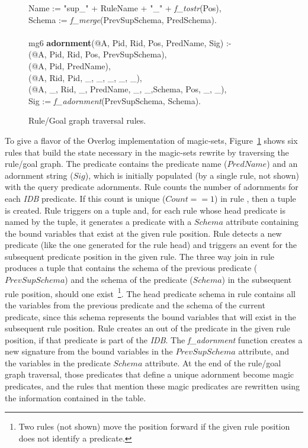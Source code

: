 \begin{figure}[t]
\begin{boxedminipage}{\linewidth}
\datalogspace Name := "sup\_" + RuleName + "\_" + {\em f\_tostr}(Pos),\\
\datalogspace Schema := {\em f\_merge}(PrevSupSchema, PredSchema).\\
\\
mg6 {\small \bf adornment}(@A, Pid, Rid, Pos, PredName, Sig) :- \\
(@A, Pid, Rid, Pos, PrevSupSchema),\\
(@A, Pid, PredName), \\
(@A, Rid, Pid, \_, \_, \_, \_, \_),\\
(@A, \_, Rid, \_, PredName, \_, \_,Schema, Pos, \_, \_),\\ 
\datalogspace Sig := {\em f\_adornment}(PrevSupSchema, Schema).
\end{boxedminipage}
\caption{\label{fig:magicRules}Rule/Goal graph traversal rules.}
\end{figure}

To give a flavor of the Overlog implementation of magic-sets,
Figure~\ref{fig:magicRules} shows six rules that build the state
necessary in the magic-sets rewrite by traversing the rule/goal graph. 
The  predicate contains the predicate name ($PredName$) and an
adornment string ($Sig$), which is initially populated (by a single rule, not shown) with
the query predicate adornments. Rule  counts the number of
adornments for each {\em IDB} predicate. If this count is unique ($Count == 1$) in rule ,
then a  tuple is created. Rule  triggers on a  tuple and, for each
rule whose head predicate is named by the  tuple, it generates a  predicate
with a $Schema$ attribute containing the bound variables that exist at the given rule position. 
Rule  detects a new  predicate (like the one generated for the rule head) and triggers 
an event for the subsequent  predicate position in the given rule. The three way join in rule  
produces a tuple that contains the schema of the previous  predicate ($PrevSupSchema$) 
and the schema of the predicate ($Schema$) in the subsequent rule position, should one 
exist~\footnote{Two rules (not shown) move the  position forward if the given rule position does 
not identify a predicate.}. The head  predicate schema in rule  contains all the variables from the 
previous  predicate and the schema of the current predicate, since this schema represents the bound variables
that will exist in the subsequent rule position. Rule  creates an  out of the predicate 
in the given rule position, if that predicate is part of the {\em IDB}. The {\em f\_adornment} 
function creates a new signature from the bound variables in the $PrevSupSchema$ attribute, 
and the variables in the predicate $Schema$ attribute. At the end of the rule/goal graph traversal, 
those predicates that define a unique adornment become magic predicates, and the rules that mention 
these magic predicates are rewritten using the information contained in the  table.

